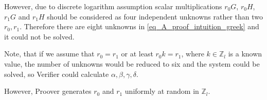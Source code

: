 \documentclass{article}
\numberwithin{figure}{section}
\begin{document}
However, due to discrete logarithm assumption scalar multiplications $r_0 G$, $r_0 H$, $r_1 G$ and $r_1 H$ should be considered as four independent unknowns rather than two $r_0, r_1$. Therefore there are eight unknowns in \eqref{eq_A_proof_intuition_greek} and it could not be solved.

Note, that if we assume that $r_0 = r_1$ or at least $r_0 k = r_1$, where $k \in \mathbb{Z}_l$ is a known value, the number of unknowns would be reduced to six and the system could be solved, so Verifier could calculate $\alpha, \beta, \gamma, \delta$.

However, Proover generates $r_0$ and $r_1$ uniformly at random in $\mathbb{Z}_l$.
\end{document}
